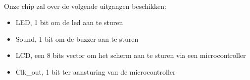 \noindent
\\
Onze chip zal over de volgende uitgangen beschikken:
\begin{itemize}[nolistsep]
\item	LED, 1 bit om de led aan te sturen
\item	Sound, 1 bit om de buzzer aan te sturen
\item	LCD, een 8 bits vector om het scherm aan te sturen via een microcontroller
\item  Clk\_out, 1 bit ter aansturing van de microcontroller
\end{itemize}